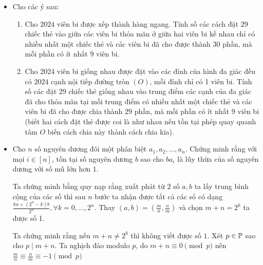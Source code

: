 \documentclass[11pt]{scrartcl}
\begin{document}
\begin{itemize}[label=, leftmargin=0em, itemsep=0.5em]
    \item \begin{btvn}
        Cho các ý sau:
        \begin{enumerate}[label=(\alph*)]
            \item Cho $2024$ viên bi được xếp thành hàng ngang. Tính số các cách đặt $29$ chiếc thẻ vào giữa các viên bi thỏa mãn ở giữa hai viên bi kề nhau chỉ có nhiều nhất một chiếc thẻ và các viên bi đã cho được thành $30$ phần, mà mỗi phần có ít nhất $9$ viên bi.
            \item Cho 2024 viên bi giống nhau được đặt vào các đỉnh của hình đa giác đều có $2024$ cạnh nội tiếp đường tròn $(O)$, mỗi đỉnh chỉ có 1 viên bi. Tính số các đặt 29 chiếc thẻ giống nhau vào trung điểm các cạnh của đa giác đã cho thỏa mãn tại mỗi trung điểm có nhiều nhất một chiếc thẻ và các viên bi đã cho được chia thành $29$ phần, mà mỗi phần có ít nhất 9 viên bi (biết hai cách đặt thẻ được coi là như nhau nếu tồn tại phép quay quanh tâm $O$ biến cách chia này thành cách chia kia).
        \end{enumerate}
    \end{btvn}
    \item \begin{btvn}
        Cho $n$ số nguyên dương đôi một phân biệt $a_1,a_2,\dots,a_n$. Chứng minh rằng với mọi $i \in [n]$, tồn tại số nguyên dương $b$ sao cho $ba_i$ là lũy thừa của số nguyên dương với số mũ lớn hơn $1$.
    \end{btvn}
    \begin{sol}
        Ta chứng minh bằng quy nạp rằng xuất phát từ $2$ số $a,b$ ta lấy trung bình cộng của các số thì sau $n$ bước ta nhận được tất cả các số có dạng $\frac{ka + (2^n -k)b}{2^n},\forall k = 0,\dots,2^n$. Thay $(a,b) = \left(\frac{m}{n}, \frac{n}{m}\right)$ và chọn $m + n =2^k$ ta được số 1. 
        
        Ta chứng minh rằng nếu $m + n \neq 2^k$ thì không viết được số $1$. Xét $p \in \mathbb{P}$ sao cho $p \mid m + n$. Ta nghịch đảo modulo $p$, do $m + n \equiv 0 \pmod{p}$ nên $\frac{m}{n} \equiv \frac{n}{m} \equiv - 1 \pmod{p}$
      

\end{sol}
\end{itemize}
\end{document}
